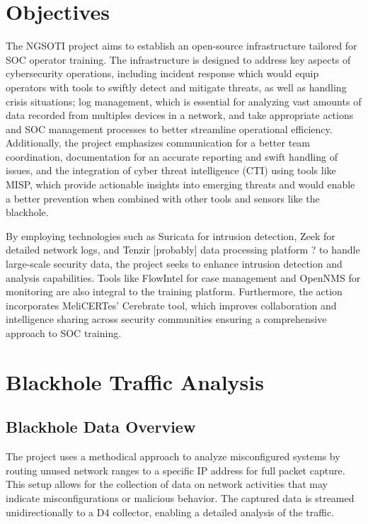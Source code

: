 \chapter{Objectives}
The NGSOTI project aims to establish an open-source infrastructure tailored for SOC operator training. The infrastructure is designed to address key aspects of cybersecurity operations, including incident response {\color{red} which would equip operators with tools to swiftly detect and mitigate threats, as well as handling crisis situations}; log management, {\color{red} which is essential for analyzing vast amounts of data recorded from multiples devices in a network, and take appropriate actions} and SOC management processes {\color{red} to better streamline operational efficiency}. Additionally, the project emphasizes communication {\color{red} for a better team coordination}, documentation {\color{red} for an accurate reporting and swift handling of issues}, and the integration of cyber threat intelligence (CTI) using tools like MISP, {\color{red} which provide actionable insights into emerging threats and would enable a better prevention when combined with other tools and sensors like the blackhole.}

By employing technologies such as Suricata {\color{red} for intrusion detection}, Zeek {\color{red} for detailed network logs}, and Tenzir  {\color{red} [probably] data processing platform ? to handle large-scale security data}, the project seeks to enhance intrusion detection and analysis capabilities. Tools like FlowIntel for case management and OpenNMS for monitoring are also integral to the training platform. Furthermore, the action incorporates MeliCERTes' Cerebrate tool, {\color{red} which improves collaboration and intelligence sharing across security communities} ensuring a comprehensive approach to SOC training.




\chapter{Blackhole Traffic Analysis}

{\color{red} \section{Blackhole Data Overview}}

The project uses a methodical approach to analyze misconfigured systems by routing unused network ranges to a specific IP address for full packet capture. This setup allows for the collection of data on network activities that may indicate misconfigurations or malicious behavior. The captured data is streamed unidirectionally to a D4 collector, enabling a detailed analysis of the traffic.

